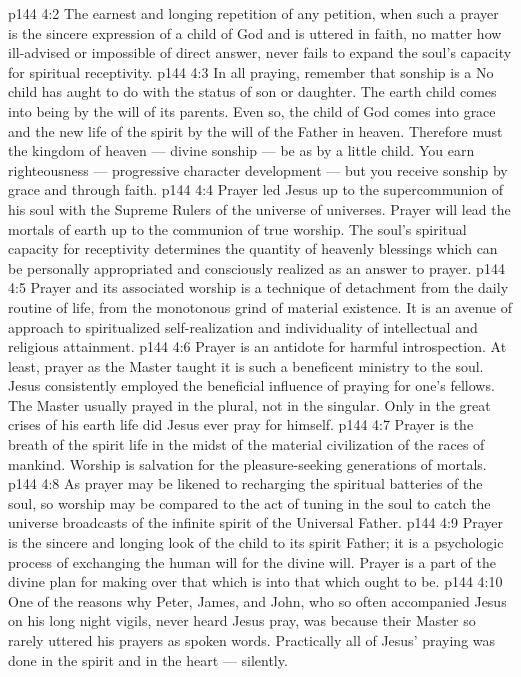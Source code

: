 \vs p144 4:2 \pc The earnest and longing repetition of any petition, when such a prayer is the sincere expression of a child of God and is uttered in faith, no matter how ill\hyp{}advised or impossible of direct answer, never fails to expand the soul’s capacity for spiritual receptivity.
\vs p144 4:3 In all praying, remember that sonship is a  No child has aught to do with  the status of son or daughter. The earth child comes into being by the will of its parents. Even so, the child of God comes into grace and the new life of the spirit by the will of the Father in heaven. Therefore must the kingdom of heaven --- divine sonship --- be  as by a little child. You earn righteousness --- progressive character development --- but you receive sonship by grace and through faith.
\vs p144 4:4 Prayer led Jesus up to the supercommunion of his soul with the Supreme Rulers of the universe of universes. Prayer will lead the mortals of earth up to the communion of true worship. The soul’s spiritual capacity for receptivity determines the quantity of heavenly blessings which can be personally appropriated and consciously realized as an answer to prayer.
\vs p144 4:5 Prayer and its associated worship is a technique of detachment from the daily routine of life, from the monotonous grind of material existence. It is an avenue of approach to spiritualized self\hyp{}realization and individuality of intellectual and religious attainment.
\vs p144 4:6 Prayer is an antidote for harmful introspection. At least, prayer as the Master taught it is such a beneficent ministry to the soul. Jesus consistently employed the beneficial influence of praying for one’s fellows. The Master usually prayed in the plural, not in the singular. Only in the great crises of his earth life did Jesus ever pray for himself.
\vs p144 4:7 Prayer is the breath of the spirit life in the midst of the material civilization of the races of mankind. Worship is salvation for the pleasure\hyp{}seeking generations of mortals.
\vs p144 4:8 As prayer may be likened to recharging the spiritual batteries of the soul, so worship may be compared to the act of tuning in the soul to catch the universe broadcasts of the infinite spirit of the Universal Father.
\vs p144 4:9 Prayer is the sincere and longing look of the child to its spirit Father; it is a psychologic process of exchanging the human will for the divine will. Prayer is a part of the divine plan for making over that which is into that which ought to be.
\vs p144 4:10 \pc One of the reasons why Peter, James, and John, who so often accompanied Jesus on his long night vigils, never heard Jesus pray, was because their Master so rarely uttered his prayers as spoken words. Practically all of Jesus’ praying was done in the spirit and in the heart --- silently.
